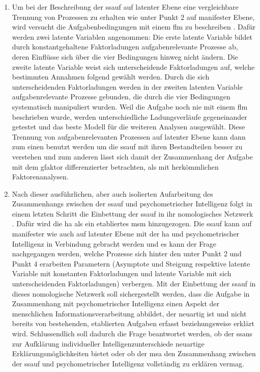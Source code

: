 \documentclass[11pt, twoside, a4paper]{book}		%
\begin{document}
\begin{enumerate}
	\item Um bei der Beschreibung der \gls{ssauf} auf latenter Ebene eine vergleichbare Trennung von Prozessen zu erhalten wie unter Punkt 2 auf manifester Ebene, wird versucht die Aufgabenbedingungen mit einem \gls{flm} zu beschreiben
	.
	Dafür werden zwei latente Variablen angenommen: Die erste latente Variable bildet durch konstantgehaltene Faktorladungen aufgabenrelevante Prozesse ab, deren Einflüsse sich über die vier Bedingungen hinweg nicht ändern. 
	Die zweite latente Variable weist sich unterscheidende Faktorladungen auf, welche  bestimmten Annahmen folgend gewählt werden.
	Durch die sich unterscheidenden Faktorladungen werden in der zweiten latenten Variable aufgabenrelevante Prozesse gebunden, die durch die vier Bedingungen systematisch manipuliert wurden. Weil die Aufgabe noch nie mit einem \gls{flm} beschrieben wurde, werden unterschiedliche Ladungsverläufe gegeneinander getestet und das beste Modell für die weiteren Analysen ausgewählt.
	Diese Trennung von aufgabenrelevanten Prozessen auf latenter Ebene kann dann zum einen benutzt werden um die \gls{ssauf} mit ihren Bestandteilen besser zu verstehen und zum anderen lässt sich damit der Zusammenhang  der Aufgabe mit dem \gls{gfaktor} differenzierter betrachten, als mit herkömmlichen Faktorenanalysen.

	\item Nach dieser ausführlichen, aber auch isolierten Aufarbeitung des Zusammenhangs zwischen der \gls{ssauf} und psychometrischer Intelligenz folgt in einem letzten Schritt die Einbettung der \gls{ssauf} in ihr nomologisches Netzwerk \citep{Cronbach1955}. Dafür wird die \gls{ha} als ein etabliertes \gls{msm} hinzugezogen. Die \gls{ssauf} kann auf manifester wie auch auf latenter Ebene mit der \gls{ha} und psychometrischer Intelligenz in Verbindung gebracht werden und es kann der Frage nachgegangen werden, welche Prozesse sich hinter den unter Punkt 2 und Punkt 4 erarbeiten Parametern (Asymptote und Steigung respektive latente Variable mit konstanten Faktorladungen und latente Variable mit sich unterscheidenden Faktorladungen) verbergen. Mit der Einbettung der \gls{ssauf} in dieses nomologische Netzwerk soll sichergestellt werden, dass die Aufgabe in Zusammenhang mit psychometrischer Intelligenz einen Aspekt der menschlichen Informationsverarbeitung abbildet, der neuartig ist und nicht bereits von bestehenden, etablierten Aufgaben erfasst beziehungsweise erklärt wird. Schlussendlich soll dadurch die Frage beantwortet werden, ob der \gls{ssans} zur Aufklärung individueller Intelligenzunterschiede neuartige Erklärungsmöglichkeiten bietet oder ob der \gls{msa} den Zusammenhang zwischen der \gls{ssauf} und psychometrischer Intelligenz vollständig zu erklären vermag.

\end{enumerate}
\end{document}
